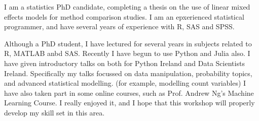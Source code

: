 I am a statistics PhD candidate, completing a thesis on the use of linear mixed effects models for method comparison studies.
I am an epxerienced statistical programmer, and have several years of experience with R, SAS and SPSS.

Although a PhD student, I have lectured for several years in subjects related to R, MATLAB anbd SAS.
Recently I have begun to use Python and Julia also. I have given introductory talks on both for Python Ireland and Data Scientists Ireland.
Specifically my talks focussed on data manipulation, probability topics, and advanced statistical modelling.
(for example, modelling count variables)
I have also taken part in some online courses, such as Prof. Andrew Ng's Machine Learning Course. I really enjoyed it, and I hope
that this workshop will properly develop my skill set in this area.

